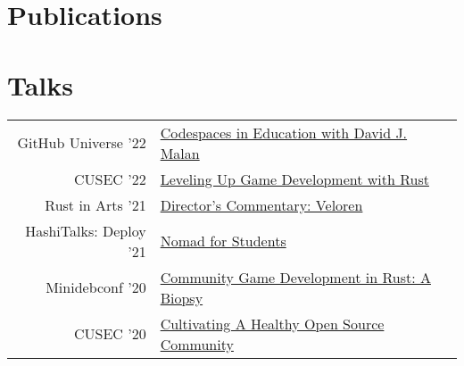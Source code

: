 \documentclass[]{deedy-resume-openfont}
\begin{document}
\begin{minipage}[t]{0.66\textwidth}

\section{Publications} 
\renewcommand\refname{\vskip -1.5em} %


\nocite{*}

\section{Talks}

\begin{tabular}{rll}

GitHub Universe '22 & \href{https://www.youtube.com/watch?v=LuiqVZnOaVk}{Codespaces in Education with David J. Malan} \\

CUSEC '22 & \href{https://www.youtube.com/watch?v=C4ksw3Jvq4E}{Leveling Up Game Development with Rust} \\

Rust in Arts '21 & \href{https://www.youtube.com/watch?v=N1f10QC5O4M}{Director's Commentary: Veloren} \\

HashiTalks: Deploy '21 & \href{https://www.youtube.com/watch?v=76ckrB4W2ss}{Nomad for Students} \\

Minidebconf '20 & \href{https://www.youtube.com/watch?v=76FPpOnshNw}{Community Game Development in Rust: A Biopsy} \\

CUSEC '20 & \href{https://www.youtube.com/watch?v=aS26sqT09Pw}{Cultivating A Healthy Open Source Community} \\

\end{tabular}
\sectionsep

\end{minipage} 
\end{document}
